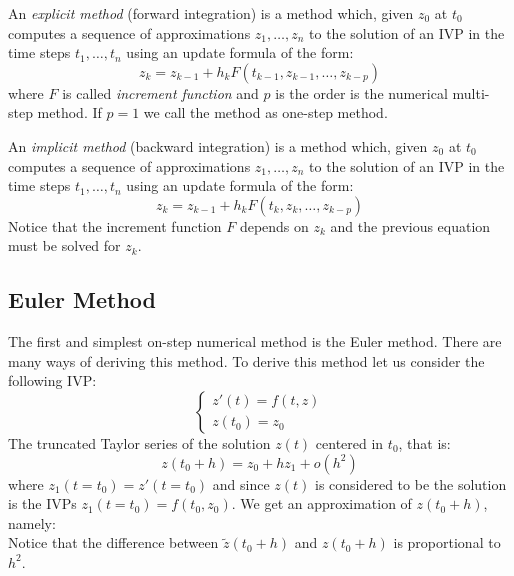\begin{definition}
	An \textit{explicit method} (forward integration) is a method which, given $z_0$ at $t_0$ computes a sequence of approximations $z_1, \dots, z_n$ to the solution of an IVP in the time steps $t_1, \dots, t_n$ using an update formula of the form:
	\begin{equation}
		z_k = z_{k-1} + h_kF(t_{k-1},z_{k-1},\dots,z_{k-p})
	\end{equation}
	where $F$ is called \textit{increment function} and $p$ is the order is the numerical multi-step method. If $p=1$ we call the method as one-step method. 
\end{definition}

\begin{definition}
	An \textit{implicit method} (backward integration) is a method which, given $z_0$ at $t_0$ computes a sequence of approximations $z_1, \dots, z_n$ to the solution of an IVP in the time steps $t_1, \dots, t_n$ using an update formula of the form:
	\begin{equation}
		z_k = z_{k-1} + h_kF(t_{k},z_{k},\dots,z_{k-p})
	\end{equation}
	Notice that the increment function $F$ depends on $z_k$ and the previous equation must be solved for $z_k$.
\end{definition}

\subsection{Euler Method}
The first and simplest on-step numerical method is the Euler method. There are many ways of deriving this method. To derive this method let us consider the following IVP:
\begin{equation}
	\begin{cases}
		z'(t) = f(t,z) \\
		z(t_0)= z_0
	\end{cases}
\end{equation}
The truncated Taylor series of the solution $z(t)$ centered in $t_0$, that is:
\begin{equation}
	z(t_0+h) = z_0 + hz_1 + o(h^2)
	\label{eq::taylor_euler}
\end{equation}
where $z_1(t=t_0)=z'(t=t_0)$ and since $z(t)$ is considered to be the solution is the IVPs $z_1(t=t_0)=f(t_0,z_0)$. We get an approximation of $z(t_0+h)$, namely:
\begin{equation}
	\label{eq::euler_0}
\end{equation}
Notice that the difference between $\tilde{z}(t_0+h)$ and $z(t_0+h)$ is proportional to $h^2$.

